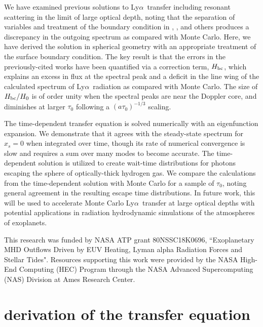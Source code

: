 \documentclass[linenumbers]{aastex63}
\newcommand\lya{Ly$\alpha$\ }
\begin{document}
We have examined previous solutions to \lya transfer including resonant scattering in the limit of large optical depth, noting that the separation of variables and treatment of the boundary condition in \citet{1973MNRAS.162...43H}, \citet{1990ApJ...350..216N}, \citet{2006ApJ...649...14D} and others produces a discrepancy in the outgoing spectrum as compared with Monte Carlo. Here, we have derived the solution in spherical geometry with an appropriate treatment of the surface boundary condition. The key result is that the errors in the previously-cited works have been quantified via a correction term, $H_{\rm bc}$, which explains an excess in flux at the spectral peak and a deficit in the line wing of the calculated spectrum of \lya radiation as compared with Monte Carlo. The size of $H_{\rm bc}/H_0$ is of order unity when the spectral peaks are near the Doppler core, and diminishes at larger $\tau_0$ following a $(a\tau_0)^{-1/3}$ scaling. 

The time-dependent transfer equation is solved numerically with an eigenfunction expansion. We demonstrate that it agrees with the steady-state spectrum for $x_s=0$ when integrated over time, though its rate of numerical convergence is slow and requires a sum over many modes to become accurate. The time-dependent solution is utilized to create wait-time distributions for photons escaping the sphere of optically-thick hydrogen gas. We compare the calculations from the time-dependent solution with Monte Carlo for a sample of $\tau_0$, noting general agreement in the resulting escape time distributions. In future work, this will be used to accelerate Monte Carlo \lya transfer at large optical depths with potential applications in radiation hydrodynamic simulations of the atmospheres of exoplanets.

\acknowledgments

This research was funded by NASA ATP grant 80NSSC18K0696, ``Exoplanetary MHD Outflows Driven by EUV Heating, Lyman alpha Radiation Forces and Stellar Tides". Resources supporting this work were provided by the NASA High-End Computing (HEC) Program through the NASA Advanced Supercomputing (NAS) Division at Ames Research Center.
\restartappendixnumbering


\appendix
\section{ derivation of the transfer equation } \label{app:rteqn_derivation}
\end{document}
